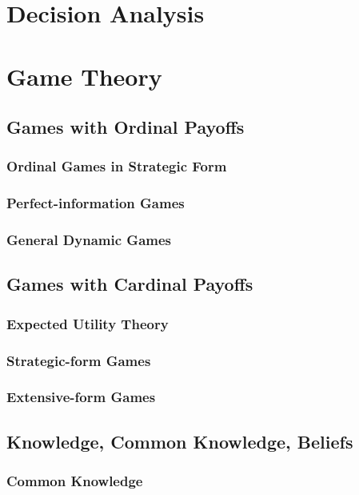 

\part{Decision Analysis}

\part{Game Theory}
	\chapter{Games with Ordinal Payoffs}
		\section{Ordinal Games in Strategic Form}

		\section{Perfect-information Games}

		\section{General Dynamic Games}

	\chapter{Games with Cardinal Payoffs}
		\section{Expected Utility Theory}

		\section{Strategic-form Games}

		\section{Extensive-form Games}

	\chapter{Knowledge, Common Knowledge, Beliefs}
		\section{Common Knowledge}

